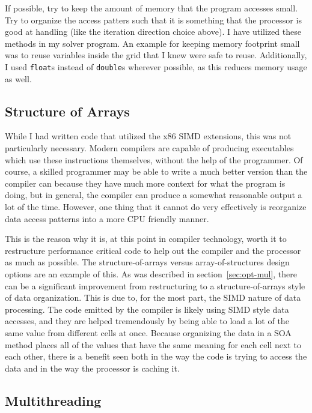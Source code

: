 If possible, try to keep the amount of memory that the program accesses small. Try to organize the access patters such that it is
something that the processor is good at handling (like the iteration direction choice above). I have utilized these methods in my
solver program. An example for keeping memory footprint small was to reuse variables inside the grid that I knew were safe to reuse.
Additionally, I used \texttt{float}s instead of \texttt{double}s wherever possible, as this reduces memory usage as well.

\subsection{Structure of Arrays}

While I had written code that utilized the x86 SIMD extensions, this was not particularly necessary. Modern compilers are capable
of producing executables which use these instructions themselves, without the help of the programmer. Of course, a skilled programmer
may be able to write a much better version than the compiler can because they have much more context for what the program is doing,
but in general, the compiler can produce a somewhat reasonable output a lot of the time. However, one thing that it cannot do very
effectively is reorganize data access patterns into a more CPU friendly manner.

This is the reason why it is, at this point in compiler technology, worth it to restructure performance critical code to help out
the compiler and the processor as much as possible. The structure-of-arrays versus array-of-structures design options are an example
of this. As was described in section~\ref{sec:opt-mul}, there can be a significant improvement from restructuring to a structure-of-arrays
style of data organization. This is due to, for the most part, the SIMD nature of data processing. The code emitted by the compiler
is likely using SIMD style data accesses, and they are helped tremendously by being able to load a lot of the same value from different
cells at once. Because organizing the data in a SOA method places all of the values that have the same meaning for each cell next to
each other, there is a benefit seen both in the way the code is trying to access the data and in the way the processor is caching it.

\subsection{Multithreading}

